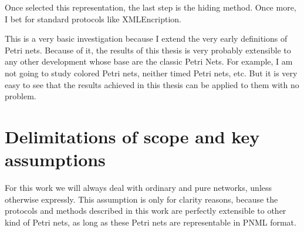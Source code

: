 Once selected this representation, the last step is the hiding method. Once
more, I bet for standard protocols like XMLEncription.

This is a very basic investigation because I extend the very early
definitions of Petri nets. Because of it, the results of this thesis is very probably extensible to any other development whose base are the classic Petri Nets. For example, I am not going to study colored Petri nets, neither timed
Petri nets, etc. But it is very easy to see that the results achieved in
this thesis can be applied to them with no problem.  

\section{Delimitations of scope and key assumptions}  
For this work we will always deal with ordinary and pure networks, unless otherwise expressly. This assumption is only for clarity reasons, because
the protocols and methods described in this work are perfectly extensible
to other kind of Petri nets, as long as these Petri nets are representable
in PNML format.





